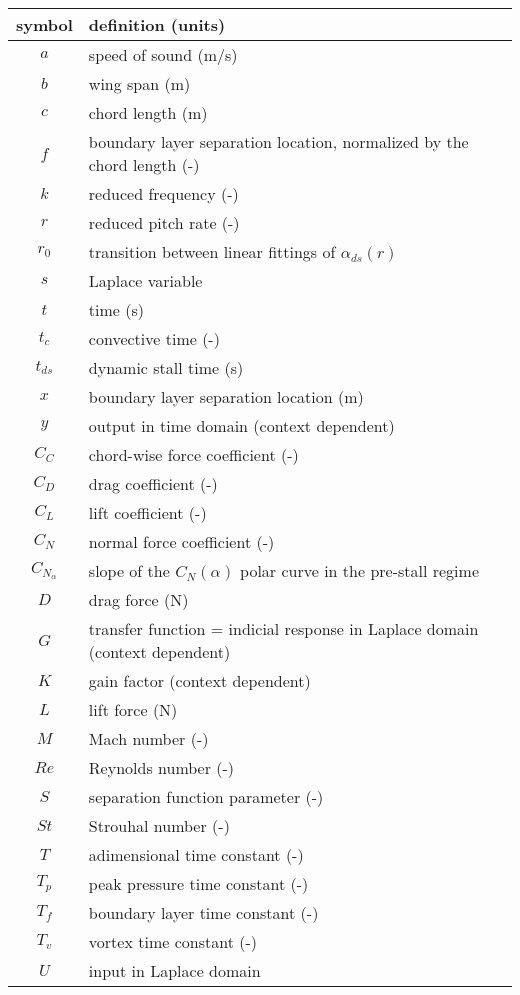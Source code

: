 \begin{tabular}{c|l}
\textbf{symbol} & \textbf{definition (units)} \\
\hline
$a$ & speed of sound (m/s) \\
$b$ & wing span (m) \\
$c$ & chord length (m) \\
$f$ & boundary layer separation location, normalized by the chord length (-) \\
$k$ & reduced frequency (-) \\
$r$ & reduced pitch rate (-) \\
$r_0$ & transition between linear fittings of $\alpha_{ds}(r)$ \\
$s$ & Laplace variable \\
$t$ & time (s) \\
$t_c$ & convective time (-) \\
$t_{ds}$ & dynamic stall time (s) \\
$x$ & boundary layer separation location (m) \\ 
$y$ & output in time domain (context dependent) \\
$C_C$ & chord-wise force coefficient (-) \\ %
$C_D$ & drag coefficient (-) \\
$C_L$ & lift coefficient (-) \\
$C_N$ & normal force coefficient (-) \\
$C_{N_\alpha}$ & slope of the $C_N(\alpha)$ polar curve in the pre-stall regime \\
$D$ & drag force (N) \\
$G$ & transfer function =  indicial response in Laplace domain (context dependent)\\
$K$ & gain factor (context dependent) \\
$L$ & lift force (N) \\
$M$ & Mach number (-) \\
$Re$ & Reynolds number (-) \\
$S$ & separation function parameter (-) \\ 
$St$ & Strouhal number (-) \\
$T$ & adimensional time constant (-) \\
$T_p$ & peak pressure time constant (-) \\
$T_f$ & boundary layer time constant (-) \\
$T_v$ & vortex time constant (-) \\
$U$ & input in Laplace domain \\

\end{tabular}
